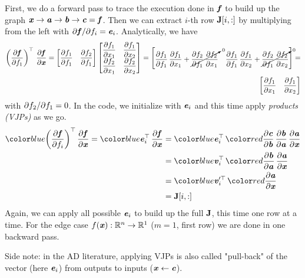\documentclass[paper=a4,11pt,headsepline]{scrartcl}
\begin{document}
First, we do a forward pass to trace the execution done in $\bm{\mathit{f}}$ to build up
the graph $\bm{\mathit{x}}\rightarrow \bm{\mathit{a}}\rightarrow \bm{\mathit{b}}\rightarrow \bm{\mathit{c}} = \bm{\mathit{f}}$. Then we can extract
$i$-th row $\bm{\mathbf{J}}[i,:]$ by multiplying from the left with $\partial \bm{\mathit{f}}/\partial f_i =
\bm{\mathit{e}}_i$. Analytically, we have
\begin{equation*}
    \begin{split}
    \left(\dfrac{\partial \bm{\mathit{f}}}{\partial f_1}\right)^\top\,\dfrac{\partial \bm{\mathit{f}}}{\partial \bm{\mathit{x}}}
    =
    \begin{bmatrix}
        \dfrac{\partial f_1}{\partial f_1} & \dfrac{\partial f_2}{\partial f_1} \\
    \end{bmatrix}
    \begin{bmatrix}
        \dfrac{\partial f_1}{\partial x_1} & \dfrac{\partial f_1}{\partial x_2} \\
        \dfrac{\partial f_2}{\partial x_1} & \dfrac{\partial f_2}{\partial x_2} \\
    \end{bmatrix}
    =
    \begin{bmatrix}
        \dfrac{\partial f_1}{\partial f_1}\,\dfrac{\partial f_1}{\partial x_1} + \cancelto{0}{\dfrac{\partial f_2}{\partial f_1}\,\dfrac{\partial f_2}{\partial x_1}} &
        \dfrac{\partial f_1}{\partial f_1}\,\dfrac{\partial f_1}{\partial x_2} + \cancelto{0}{\dfrac{\partial f_2}{\partial f_1}\,\dfrac{\partial f_2}{\partial x_2}}
    \end{bmatrix}
    =\\
    \begin{bmatrix}
        \dfrac{\partial f_1}{\partial x_1} & \dfrac{\partial f_1}{\partial x_2}
    \end{bmatrix}
    \end{split}
\end{equation*}
with $\partial f_2/\partial f_1=0$.
In the code, we initialize with $\bm{\mathit{e}}_i$ and this time apply
\emph{  products (VJPs)} as we go.
\begin{align*}
    \blue{\left(\pd{\ve f}{f_i}\right)^\top}\,\pd{\ve f}{\ve x} = \blue{\ve e_i^\top}\,\pd{\ve f}{\ve x}
        &= \blue{\ve e_i^\top}\,\red{\pd{\ve c}{\ve b}}\,\pd{\ve b}{\ve a}\,\pd{\ve a}{\ve x}\\
        &= \blue{\ve v_i^\top}\,\red{\pd{\ve b}{\ve a}}\,\pd{\ve a}{\ve x}\\
        &= \blue{\ve v_i'^\top}\,\red{\pd{\ve a}{\ve x}}\\
        &= \ma J[i,:]
\end{align*}
Again, we can apply all possible $\bm{\mathit{e}}_i$ to build up the full $\bm{\mathbf{J}}$, this
time one row at a time. For the edge case $f(\bm{\mathit{x}}): \mathbb R^n \rightarrow \mathbb
R^1$ ($m=1$, first row) we are done in one backward pass.

Side note: in the AD literature, applying VJPs is also called "pull-back" of
the vector (here $\bm{\mathit{e}}_i$) from outputs to inputs ($\bm{\mathit{x}}\leftarrow\bm{\mathit{c}}$).
\end{document}
